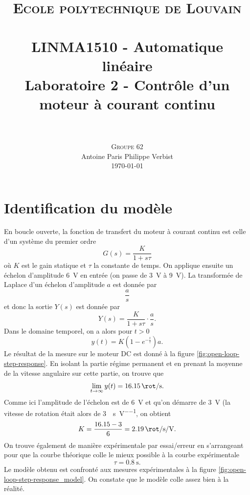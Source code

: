 \documentclass[frenchb, paper=a4, fontsize=11pt]{scrartcl}
\title{
		\usefont{OT1}{bch}{b}{n}
		\normalfont \normalsize \textsc{Ecole polytechnique de Louvain} \\ [25pt]
		\horrule{0.5pt} \\[0.4cm]
		\large LINMA1510 - Automatique linéaire\\
		\huge Laboratoire 2 - Contrôle d'un moteur à courant continu \\
		\horrule{1.5pt} \\[0.5cm]
}
\author{
		\normalfont
		\textsc{Groupe 62}\\
      	Antoine Paris\hspace{0.6cm} Philippe Verbist \\	
       	\normalsize
        \today
}
\date{}
\numberwithin{equation}{section}					%
\numberwithin{figure}{section}					%
\numberwithin{table}{section}						%
\begin{document}
\maketitle

\section{Identification du modèle}
En boucle ouverte, la fonction de transfert du moteur à courant
continu est celle d'un système du premier ordre
\begin{equation}
	G(s) = \frac{K}{1+s\tau}
\end{equation}
où $K$ est le gain statique et $\tau$ la constante de temps.
On applique ensuite un échelon d'amplitude \SI{6}{\volt} en
entrée (on passe de \SI{3}{\volt} à \SI{9}{\volt}). La
transformée de Laplace d'un échelon d'amplitude $a$ est donnée
par
\begin{equation}
	\frac{a}{s}
\end{equation}
et donc la sortie $Y(s)$ est donnée par
\begin{equation}
	Y(s) = \frac{K}{1+s\tau}\cdot\frac{a}{s}.
\end{equation}
Dans le domaine temporel, on a alors pour $t > 0$
\begin{equation}
	y(t) = K(1-e^{-\frac{t}{\tau}})a.
\end{equation}
Le résultat de la mesure sur le moteur DC est donné à la figure
\ref{fig:open-loop-step-response}. En isolant la partie régime
permanent et en prenant la moyenne de la vitesse angulaire sur
cette partie, on trouve que
\begin{equation}
	\lim_{t\to\infty} y(t) = \SI{16.15}{\rot\per\second}.
\end{equation}
Comme ici l'amplitude de l'échelon est de \SI{6}{\volt} et qu'on
démarre de \SI{3}{\volt} (la vitesse de rotation 
était alors de \SI{3}{\rot\per\second\per\volt}, on obtient
\begin{equation}
	K = \frac{16.15-3}{6} = \SI{2.19}{\rot\per\second\per\volt}.
\end{equation}
On trouve également de manière expérimentale par essai/erreur en
s'arrangeant pour que la courbe théorique colle le mieux possible
à la courbe expérimentale
\begin{equation}
	\tau = \SI{0.8}{\second}.
\end{equation}
Le modèle obtenu est confronté aux mesures expérimentales à la
figure \ref{fig:open-loop-step-response_model}. On constate que
le modèle colle assez bien à la réalité.
\end{document}
